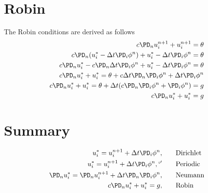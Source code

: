\documentclass[landscape]{article}
\begin{document}
\section{Robin}
The Robin conditions are derived as follows
\begin{equation}\begin{aligned}
  c \PD_n u_i^{n+1} + u_i^{n+1} = \theta \\
  c \PD_n (u_i^* - \Delta t \PD_i \phi^n) + u_i^* - \Delta t \PD_i \phi^n = \theta \\
  c \PD_n u_i^* - c \PD_n \Delta t \PD_i \phi^n + u_i^* - \Delta t \PD_i \phi^n = \theta \\
  c \PD_n u_i^* + u_i^* = \theta + c \Delta t \PD_n \PD_i \phi^n + \Delta t \PD_i \phi^n \\
  c \PD_n u_i^* + u_i^* = \theta + \Delta t (c \PD_n \PD_i \phi^n + \PD_i \phi^n) = g \\
  c \PD_n u_i^* + u_i^* = g \\
\end{aligned}\end{equation}

\section{Summary}
\begin{equation}\begin{aligned}
  u_i^* = u_i^{n+1} + \Delta t \PD_i \phi^n, \qquad & \text{Dirichlet} \\
  u_i^* = u_i^{n+1} + \Delta t \PD_i \phi^n, `'\qquad & \text{Periodic} \\
  \PD_n u_i^* = \PD_n u_i^{n+1} + \Delta t \PD_n \PD_i \phi^n, \qquad & \text{Neumann} \\
  c \PD_n u_i^* + u_i^* = g, \qquad & \text{Robin} \\
\end{aligned}\end{equation}


\end{document}
